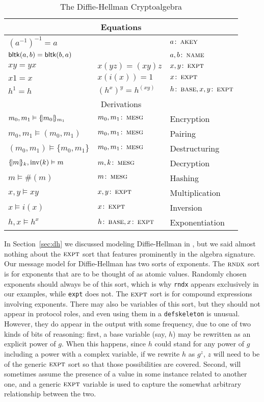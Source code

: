 \begin{table}
\begin{tabular}{|lll|}
\multicolumn{3}{c}{Equations}\\ \hline
%
$(a^{-1})^{-1} = a$ & & $a \colon \scap{akey}$\\
$\operatorname{\mathsf{bltk}}(a,b) = \operatorname{\mathsf{bltk}}(b,a)$ & & $a, b \colon \scap{name}$ \\
$xy = yx$ & $x(yz) = (xy)z$ & $x, y \colon \scap{expt}$\\
$x1 = x$ & $x(i(x)) = 1$ & $x \colon \scap{expt}$ \\
$h^1 = h$ & $(h^x)^y = h^{(xy)}$ & $h \colon \scap{base}, x, y \colon \scap{expt}$ \\
\hline
\multicolumn{3}{c}{Derivations}\\ \hline
$m_0, m_1 \vDash \{\!|m_0|\!\}_{m_1}$ & $m_0, m_1 \colon \scap{mesg}$ & Encryption \\
$m_0, m_1 \vDash (m_0, m_1)$ & $m_0, m_1 \colon \scap{mesg}$ & Pairing \\
$(m_0, m_1) \vDash \{m_0, m_1\}$ & $m_0, m_1 \colon \scap{mesg}$ & Destructuring \\
$\{\!|m|\!\}_{k}, \mathrm{inv}(k) \vDash m$ & $m, k \colon \scap{mesg}$ & Decryption \\
$m \vDash \#(m)$ & $m \colon \scap{mesg}$ & Hashing\\
$x, y \vDash xy$ & $x, y \colon \scap{expt}$ & Multiplication\\
$x \vDash i(x)$ & $x \colon \scap{expt}$ & Inversion\\
$h, x \vDash h^x$ & $h \colon \scap{base}, x \colon \scap{expt}$ & Exponentiation\\
\hline
%
\end{tabular}
\caption{The Diffie-Hellman Cryptoalgebra}
\label{tab:dh_algebra_signature}
\end{table}

In Section~\ref{sec:dh} we discussed modeling Diffie-Hellman in
{\cpsa}, but we said almost nothing about the $\scap{expt}$ sort that
features prominently in the algebra signature.  Our message model for
Diffie-Hellman has two sorts of exponents.  The $\scap{rndx}$ sort is
for exponents that are to be thought of as atomic values.  Randomly
chosen exponents should always be of this sort, which is why
\texttt{rndx} appears exclusively in our examples, while \texttt{expt}
does not.  The $\scap{expt}$ sort is for compound expressions
involving exponents.  There may also be variables of this sort, but
they should not appear in protocol roles, and even using them in a
\texttt{defskeleton} is unusual.  However, they do appear in the
output with some frequency, due to one of two kinds of bits of
reasoning: first, a base variable (say, $h$) may be rewritten as an
explicit power of $g$.  When this happens, since $h$ could stand for
any power of $g$ including a power with a complex variable, if we
rewrite $h$ as $g^z$, $z$ will need to be of the generic $\scap{expt}$
sort so that those possibilities are covered.  Second, {\cpsa} will
sometimes assume the presence of a value in some instance related to
another one, and a generic $\scap{expt}$ variable is used to capture
the somewhat arbitrary relationship between the two.

